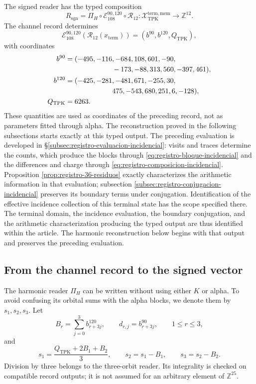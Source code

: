 The signed reader has the typed composition
\begin{equation}
 R_{\mathrm{sgn}}
 =\Pi_H\circ\mathcal E_{108}^{90,120}\circ\mathcal R_{12}:
 \mathcal X_{\mathrm{TPK}}^{\mathrm{term,mem}}
 \longrightarrow\mathbb Z^{12}.
 \label{eq:k-lector-firmado}
\end{equation}
The channel record determines
\[
 \mathcal E_{108}^{90,120}(\mathcal R_{12}(x_{\mathrm{term}}))
 =(b^{90},b^{120},Q_{\mathrm{TPK}}),
\]
with coordinates
\begin{align*}
 b^{90}={}&(-495,-116,-684,108,601,-90,\\
            &\hspace{19mm}-173,-88,313,560,-397,461),\\
 b^{120}={}&(-425,-281,-481,671,-255,30,\\
             &\hspace{19mm}475,-543,680,251,6,-128),\\
 Q_{\mathrm{TPK}}={}&6263.
\end{align*}
These quantities are used as coordinates of the preceding record, not
as parameters fitted through alpha. The reconstruction proved
in the following subsections starts exactly at this typed output.
The preceding evaluation is developed in
\S\ref{subsec:registro-evaluacion-incidencial}: visits and traces
determine the counts, which produce the blocks through
\eqref{eq:registro-bloque-incidencial} and the differences and charge through
\eqref{eq:registro-composicion-incidencial}. Proposition
\ref{prop:registro-36-residuos} exactly characterizes the
arithmetic information in that evaluation; subsection
\ref{subsec:registro-conjugacion-incidencial} preserves its boundary
terms under conjugation. Identification of the effective incidence collection
of this terminal state has the scope specified there.
The terminal domain, the incidence evaluation, the boundary conjugation,
and the arithmetic characterization producing the typed output are thus
identified within the article. The harmonic reconstruction below begins
with that output and preserves the preceding evaluation.

\subsection{From the channel record to the signed vector}
\label{subsec:k-pi-h}

The harmonic reader \(\Pi_H\) can be written without using either \(K\) or
alpha. To avoid confusing its orbital sums with the alpha blocks,
we denote them by \(s_1,s_2,s_3\). Let
\[
 B_r=\sum_{j=0}^{3}b^{120}_{r+3j},\qquad
 d_{r,j}=b^{90}_{r+3j},\qquad1\leq r\leq3,
\]
and
\begin{equation}
 s_1=\frac{Q_{\mathrm{TPK}}+2B_1+B_2}{3},\qquad
 s_2=s_1-B_1,\qquad s_3=s_2-B_2.
 \label{eq:k-sumas-armonicas}
\end{equation}
Division by three belongs to the three-orbit reader. Its
integrality is checked on compatible record outputs; it is not
assumed for an arbitrary element of \(\mathbb Z^{25}\).

